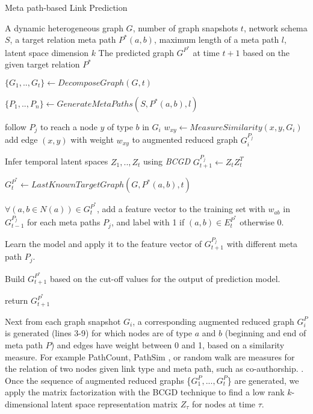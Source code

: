 \begin{algorithm}[t]
\caption{Meta path-based Link Prediction}\label{alg2}
\begin{algorithmic}[1]\scriptsize
\REQUIRE A dynamic heterogeneous graph $G$, number of graph snapshots $t$, network schema $S$, a target relation meta path $P^*(a,b)$, maximum length of a meta path $l$, latent space dimension $k$
\ENSURE The predicted graph $G^{P^*}$ at time $t+1$ based on the given target relation $P^*$

\STATE $\{G_1, .., G_t\} \leftarrow DecomposeGraph(G, t)$

\STATE $\{P_1, .., P_n\} \leftarrow GenerateMetaPaths(S, P^*(a,b), l)$


    
        \STATE follow $P_j$ to reach a node $y$ of type $b$ in $G_i$ 
        \STATE $w_{xy} \leftarrow MeasureSimilarity(x,y, G_i)$
        \STATE add edge $(x,y)$ with weight $w_{xy}$ to augmented reduced graph $G_i^{P_j}$ 
\ENDFOR

\ENDFOR

\STATE Infer temporal latent spaces $Z_1, .., Z_t$ using \textit{BCGD}%
\STATE $G^{P_j}_{t+1} \leftarrow Z_tZ^T_t$ 

\ENDFOR

\STATE $G^{P^*}_{t} \leftarrow LastKnownTargetGraph(G, P^*(a,b), t)$


\STATE $\forall (a,b\in N(a)) \in G^{P^*}_{t}$, add a feature vector to the training set with $w_{ab}$ in $G^{P_j}_{t-1}$ for each meta paths $P_j$, and label with 1 if $(a,b) \in E^{P^*}_{t}$ otherwise 0.

\STATE Learn the model and apply it to the feature vector of $G^{P_j}_{t+1}$ with different meta path $P_j$.

\STATE Build $G^{P^*}_{t+1}$ based on the cut-off values for the output of prediction model.

\STATE return $G^{P^*}_{t+1}$
\end{algorithmic}
\end{algorithm}


 Next from each graph snapshot $G_i$, a corresponding augmented reduced graph $G^P_i$ is generated (lines 3-9) for which nodes are of type $a$ and $b$ (beginning and end of meta path $P$) and edges have weight between 0 and 1, based on a similarity measure. For example PathCount\cite{sun2011pathsim}, PathSim \cite{sun2011pathsim}, or random walk are measures for the relation of two nodes given link type and meta path, such as co-authorship.
. Once the sequence of augmented reduced graphs \{$G^P_1, ..., G^P_t$\} are generated, we apply the matrix factorization with the BCGD technique \cite{Zhu2016} to find a low rank $k$-dimensional latent space representation matrix $Z_\tau$ for nodes at time $\tau$.


